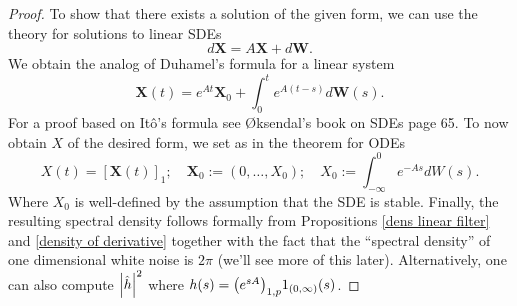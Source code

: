 \documentclass[
    a4paper,
    DIV=14,
    abstract=true,
    numbers=noenddot
]{scrartcl}
\begin{document}
\begin{proof}
	To show that there exists a solution of the given form, we can use the  theory for solutions to linear SDEs
	\begin{equation*}
		d \mathbf{X}=A \mathbf{X} +d \mathbf{W} .
	\end{equation*}
	We obtain the analog of Duhamel's formula for a linear system
	\begin{equation*}
		\textbf{X}(t)= e^{At} \textbf{X}_0+\int_{0}^te^{A(t-s)} d \textbf{W}(s).
	\end{equation*}
	For a proof based on Itô's formula see Øksendal's book on SDEs \cite{oksendal2003stochastic} page 65. To now obtain $X$ of the desired form, we set as in the theorem for ODEs
	$$X(t)= [\textbf{X}(t)]_{1} ;\quad\textbf{X}_0:=(0,\ldots,X_0);\quad X_0:=\int_{-\infty}^0e^{-As} dW(s).$$ Where $X_0$ is well-defined by the assumption that the SDE is stable. Finally, the resulting spectral density follows formally from Propositions \ref{dens linear filter} and \ref{density of derivative} together with the fact that the ``spectral density'' of one dimensional white noise is $2\pi$ (we'll see more of this later). Alternatively, one can also compute $\left| \hat{h} \right|^2$ where
	$h(s)=\qty(e^{sA})_{1,p}1_{(0,\infty)}(s)$.
\end{proof}
\end{document}
